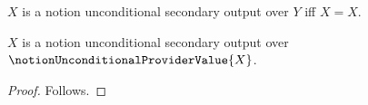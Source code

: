 

\begin{definition}\label{notion_unconditional_secondary_output}
    $X$ is a notion unconditional secondary output over $Y$ iff $X=X$.
\end{definition}

\begin{classification}\label{notion_unconditional_secondary_focus_rejected}
    $X$ is a notion unconditional secondary output over
        $\notionUnconditionalProviderValue{X}$.
\end{classification}
\begin{proof}
    Follows.
\end{proof}
